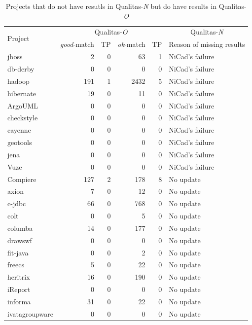 \documentclass{IEEEtran}
\begin{document}
\begin{table}[H]
	\centering
	\caption{Projects that do not have resutls in Qualitas-\textit{N} but do have results in Qualitas-\textit{O}}
	\label{tab:tp_pairs}
	\begin{tabular}{l|r|r|r|r|p{6cm}}
	\hline
	\multirow{2}{*}{Project} & \multicolumn{4}{c|}{Qualitas-\textit{O}} & \multicolumn{1}{c}{Qualitas-\textit{N}} \\ \cline{2-6}
			& \textit{good}-match & TP & \textit{ok}-match & TP & Reason of missing results \\
	\hline
	jboss		& 2 	& 	0	& 63 	& 1 & NiCad's failure \\
	db-derby 	& 0 	&	0	& 0		& 0 & NiCad's failure \\
	hadoop		& 191 	& 1 	& 2432 	& 5 & NiCad's failure \\
	hibernate 	& 19 	& 	0	& 11 	& 0 & NiCad's failure \\
	ArgoUML		& 0		& 	0	& 0		& 0 & NiCad's failure \\
	checkstyle	& 0		&	0	& 0		& 0 & NiCad's failure \\
	cayenne		& 0		& 	0	& 0		& 0 & NiCad's failure \\
	geotools	& 0		& 	0	& 0		& 0 & NiCad's failure \\
	jena		& 0		& 	0	& 0		& 0 & NiCad's failure \\
	Vuze		& 0		&	0	& 0		& 0 & NiCad's failure \\
	Compiere	& 127	& 2		& 178	& 8 & No update \\
	axion		& 7		& 	0	& 12	& 0 & No update \\
	c-jdbc		& 66	&	0	& 768	& 0 & No update \\
	colt		& 0		& 	0	& 5		& 0 & No update \\
	columba		& 14	&	0	& 177	& 0 & No update \\
	drawswf		& 0		&	0	& 0		& 0 & No update \\
	fit-java	& 0		& 0		& 2 	& 0 & No update \\
	freecs		& 5		& 0		& 22	& 0 & No update \\
	heritrix	& 16	& 0		& 190 	& 0 & No update \\
	iReport		& 0		& 0 	& 0		& 0 & No update \\
	informa		& 31	& 0 	& 22	& 0 & No update \\
	ivatagroupware	& 0	& 0		& 0		& 0 & No update \\

\end{tabular}
\end{table}
\end{document}
